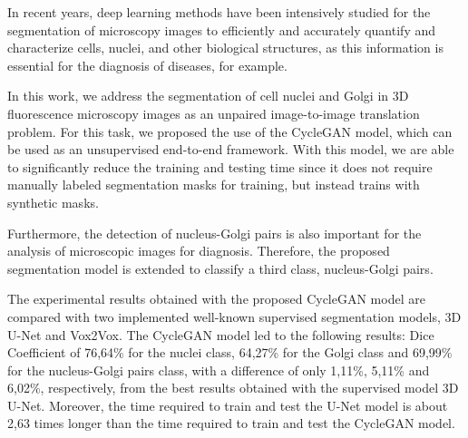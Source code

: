 \acresetall
\noindent In recent years, deep learning methods have been intensively studied for the segmentation of microscopy images to efficiently and accurately quantify and characterize cells, nuclei, and other biological structures, as this information is essential for the diagnosis of diseases, for example.

In this work, we address the segmentation of cell nuclei and Golgi in \ac{3D} fluorescence microscopy images as an unpaired image-to-image translation problem. For this task, we proposed the use of the CycleGAN model, which can be used as an unsupervised end-to-end framework. With this model, we are able to significantly reduce the training and testing time since it does not require manually labeled segmentation masks for training, but instead trains with synthetic masks.

Furthermore, the detection of nucleus-Golgi pairs is also important for the analysis of microscopic images for diagnosis. Therefore, the proposed segmentation model is extended to classify a third class, nucleus-Golgi pairs. 

The experimental results obtained with the proposed CycleGAN model are compared with two implemented well-known supervised segmentation models, \ac{3D} U-Net and Vox2Vox. The CycleGAN model led to the following results: Dice Coefficient of 76,64\% for the nuclei class, 64,27\% for the Golgi class and 69,99\% for the nucleus-Golgi pairs class, with a difference of only 1,11\%, 5,11\% and 6,02\%, respectively, from the best results obtained with the supervised model \ac{3D} U-Net. Moreover, the time required to train and test the U-Net model is about 2,63 times longer than the time required to train and test the CycleGAN model.